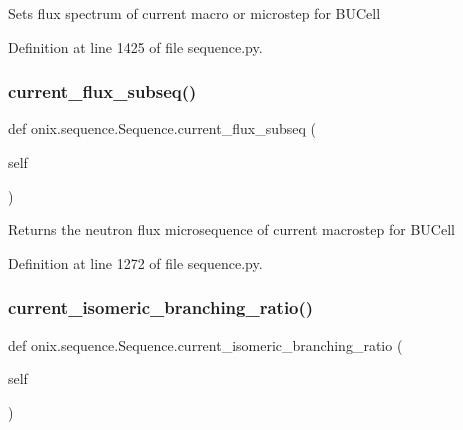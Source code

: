 \begin{DoxyVerb}Sets flux spectrum of current macro or microstep
for BUCell\end{DoxyVerb}
 

Definition at line 1425 of file sequence.\+py.

\mbox{\label{classonix_1_1sequence_1_1Sequence_aaf71d720b5530b4b2172891b93f45829}} 
\subsubsection{\texorpdfstring{current\+\_\+flux\+\_\+subseq()}{current\_flux\_subseq()}}
{\footnotesize\ttfamily def onix.\+sequence.\+Sequence.\+current\+\_\+flux\+\_\+subseq (\begin{DoxyParamCaption}\item[{}]{self }\end{DoxyParamCaption})}

\begin{DoxyVerb}Returns the neutron flux microsequence of current macrostep
for BUCell\end{DoxyVerb}
 

Definition at line 1272 of file sequence.\+py.

\mbox{\label{classonix_1_1sequence_1_1Sequence_ae09f34f2cb44a6240d404704f07b4b05}} 
\subsubsection{\texorpdfstring{current\+\_\+isomeric\+\_\+branching\+\_\+ratio()}{current\_isomeric\_branching\_ratio()}\hspace{0.1cm}{\footnotesize\ttfamily [1/2]}}
{\footnotesize\ttfamily def onix.\+sequence.\+Sequence.\+current\+\_\+isomeric\+\_\+branching\+\_\+ratio (\begin{DoxyParamCaption}\item[{}]{self }\end{DoxyParamCaption})}



